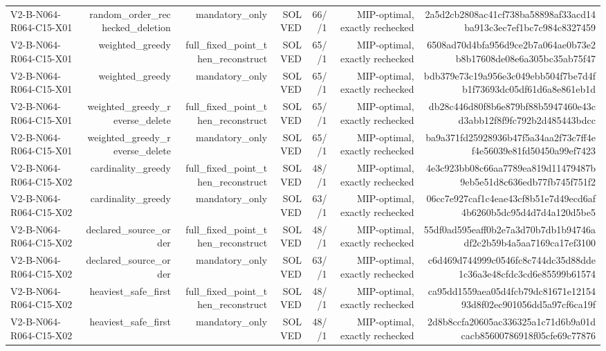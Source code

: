 {\begin{longtable}{lrrrrrr}
V2-B-N064-R064-C15-X01 & random\_order\_rechecked\_deletion & mandatory\_only & SOLVED & 66//1 & MIP-optimal, exactly rechecked & 2a5d2cb2808ac41cf738ba58898af33acd14ba913c3ec7ef1bc7c984c8327459 \\
V2-B-N064-R064-C15-X01 & weighted\_greedy & full\_fixed\_point\_then\_reconstruct & SOLVED & 65//1 & MIP-optimal, exactly rechecked & 6508ad70d4bfa956d9ce2b7a064ae0b73e2b8b17608de08e6a305bc35ab75f47 \\
V2-B-N064-R064-C15-X01 & weighted\_greedy & mandatory\_only & SOLVED & 65//1 & MIP-optimal, exactly rechecked & bdb379e73c19a956e3c049ebb504f7be7d4fb1f73693dc05df61d6a8e861eb1d \\
V2-B-N064-R064-C15-X01 & weighted\_greedy\_reverse\_delete & full\_fixed\_point\_then\_reconstruct & SOLVED & 65//1 & MIP-optimal, exactly rechecked & db28c446d80f8b6e879bf88b5947460e43cd3abb12f8f9fc792b2d485443bdcc \\
V2-B-N064-R064-C15-X01 & weighted\_greedy\_reverse\_delete & mandatory\_only & SOLVED & 65//1 & MIP-optimal, exactly rechecked & ba9a371fd25928936b47f5a34aa2f73c7ff4ef4e56039e81fd50450a99ef7423 \\
V2-B-N064-R064-C15-X02 & cardinality\_greedy & full\_fixed\_point\_then\_reconstruct & SOLVED & 48//1 & MIP-optimal, exactly rechecked & 4e3c923bb08c66aa7789ea819d11479487b9eb5e51d8c636edb77fb745f751f2 \\
V2-B-N064-R064-C15-X02 & cardinality\_greedy & mandatory\_only & SOLVED & 63//1 & MIP-optimal, exactly rechecked & 06cc7e927caf1c4eae43cf8b51e7d49ecd6af4b6260b5dc95d4d7d4a120d5be5 \\
V2-B-N064-R064-C15-X02 & declared\_source\_order & full\_fixed\_point\_then\_reconstruct & SOLVED & 48//1 & MIP-optimal, exactly rechecked & 55df0ad595eaff0b2e7a3d70b7db1b94746adf2c2b59b4a5aa7169ca17ef3100 \\
V2-B-N064-R064-C15-X02 & declared\_source\_order & mandatory\_only & SOLVED & 63//1 & MIP-optimal, exactly rechecked & c6d469d744999c0546fc8c744dc35d88dde1c36a3e48cfdc3cd6e85599b61574 \\
V2-B-N064-R064-C15-X02 & heaviest\_safe\_first & full\_fixed\_point\_then\_reconstruct & SOLVED & 48//1 & MIP-optimal, exactly rechecked & ca95dd1559aea05d4fcb79dc81671e1215493d8f02ec901056dd5a97cf6ca19f \\
V2-B-N064-R064-C15-X02 & heaviest\_safe\_first & mandatory\_only & SOLVED & 48//1 & MIP-optimal, exactly rechecked & 2d8b8ccfa20605ac336325a1c71d6b9a01dcacb85600786918f05cfe69c77876 \\

\end{longtable}}

